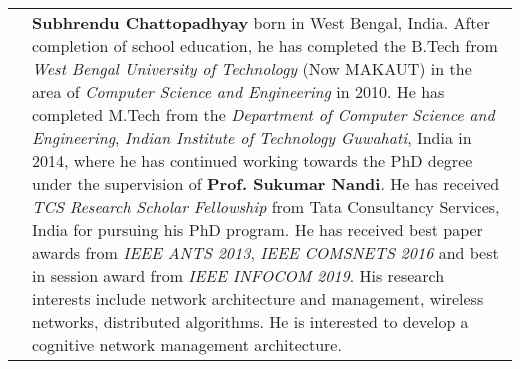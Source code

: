 \coverbio
\begin{tabular}{p{}|p{}}
\raisebox{-1.3\height}{\texttt{[image: 100-back/closeUp3.png]}} &
\large{\textbf{Subhrendu Chattopadhyay} born in West Bengal, India. After completion of school education, he has completed the B.Tech from \emph{West Bengal University of Technology} (Now MAKAUT) in the area of
 \emph{Computer Science and Engineering} in 2010. He has completed M.Tech from the \emph{Department of Computer Science and Engineering}, \emph{Indian Institute of Technology Guwahati}, India in 2014, where he has continued working towards the PhD degree under the supervision of \textbf{Prof. Sukumar Nandi}. He has received \emph{TCS Research Scholar Fellowship} from Tata Consultancy Services, India for pursuing his PhD program. He has received best paper awards from \emph{IEEE ANTS 2013}, \emph{IEEE COMSNETS 2016} and best in session award from \emph{IEEE INFOCOM 2019}. His research interests include network architecture and management, wireless networks, distributed algorithms. He is interested to develop a cognitive network management architecture.}
\end{tabular}
\endcoverbio

